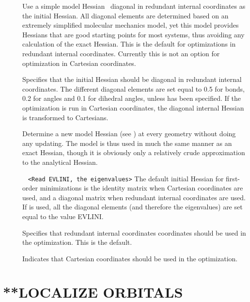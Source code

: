\begin{description}
\item[]
Use a simple model Hessian~\cite{ModelHess} diagonal in redundant
internal coordinates as the initial Hessian. All diagonal elements are
determined based on an extremely simplified molecular mechanics model,
yet this model provides Hessians that are good starting points for
most systems, thus avoiding any calculation of the exact Hessian. This
is the default for optimizations in redundant internal coordinates. Currently 
this is not an option for optimization in Cartesian coordinates.

\item[]
Specifies that the initial Hessian should be diagonal in redundant internal 
coordinates. The different diagonal
elements are set equal to 0.5 for bonds, 0.2 for angles and 0.1 for
dihedral angles, unless  has been specified. If the
optimization is run in Cartesian coordinates, the diagonal internal
Hessian is transformed to Cartesians.

\item[]
Determine a new model Hessian (see )
at every geometry without doing any updating. The model is thus used
in much the same manner as an exact Hessian, though it is obviously
only a relatively crude approximation to the analytical Hessian.

\item[]\verb| | \newline
\verb|<Read EVLINI, the eigenvalues>|\newline
The default initial Hessian for first-order
minimizations is the identity matrix when Cartesian coordinates are used, and a diagonal
matrix when redundant internal coordinates are used. If 
is used, all the diagonal elements (and therefore the eigenvalues) are
set equal to the value EVLINI. 

\item[]
Specifies that redundant internal coordinates coordinates
should be used in the optimization. This is the default.

\item[]
Indicates that Cartesian coordinates
should be used in the optimization.

\end{description}


\section{**LOCALIZE ORBITALS}\label{subsec:orbloc}

